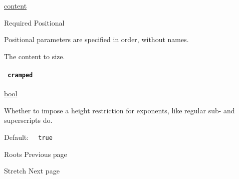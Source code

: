 \href{/docs/reference/foundations/content/}{content}

{Required} {{ Positional }}

\label{functions-sscript-body-positional-tooltip}
Positional parameters are specified in order, without names.

The content to size.

\paragraph{\texorpdfstring{\texttt{\ cramped\ }}{ cramped }}\label{functions-sscript-cramped}

\href{/docs/reference/foundations/bool/}{bool}

Whether to impose a height restriction for exponents, like regular sub-
and superscripts do.

Default: \texttt{\ }{\texttt{\ true\ }}\texttt{\ }

\href{/docs/reference/math/roots/}{\pandocbounded{}}

{ Roots } { Previous page }

\href{/docs/reference/math/stretch/}{\pandocbounded{}}

{ Stretch } { Next page }
